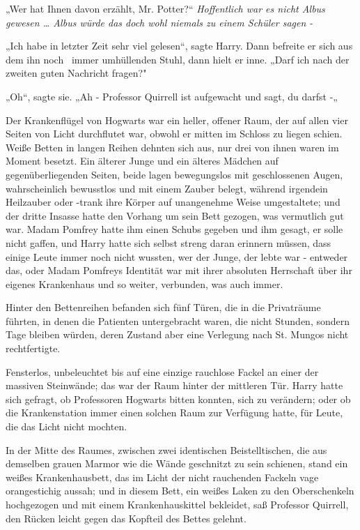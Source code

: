 {„Wer hat Ihnen davon erzählt, Mr. Potter?“ \emph{Hoffentlich war es nicht Albus gewesen … Albus würde das doch wohl niemals zu einem Schüler sagen} \emph{-}

„Ich habe in letzter Zeit sehr viel gelesen“, sagte Harry. Dann befreite er sich aus dem ihn noch ~immer umhüllenden Stuhl, dann hielt er inne. „Darf ich nach der zweiten guten Nachricht fragen?"

„Oh“, sagte sie. „Ah - Professor Quirrell ist aufgewacht und sagt, du darfst -„

Der Krankenflügel von Hogwarts war ein heller, offener Raum, der auf allen vier Seiten von Licht durchflutet war, obwohl er mitten im Schloss zu liegen schien. Weiße Betten in langen Reihen dehnten sich aus, nur drei von ihnen waren im Moment besetzt. Ein älterer Junge und ein älteres Mädchen auf gegenüberliegenden Seiten, beide lagen bewegungslos mit geschlossenen Augen, wahrscheinlich bewusstlos und mit einem Zauber belegt, während irgendein Heilzauber oder -trank ihre Körper auf unangenehme Weise umgestaltete; und der dritte Insasse hatte den Vorhang um sein Bett gezogen, was vermutlich gut war. Madam Pomfrey hatte ihm einen Schubs gegeben und ihm gesagt, er solle nicht gaffen, und Harry hatte sich selbst streng daran erinnern müssen, dass einige Leute immer noch nicht wussten, wer der Junge, der lebte war - entweder das, oder Madam Pomfreys Identität war mit ihrer absoluten Herrschaft über ihr eigenes Krankenhaus und so weiter, verbunden, was auch immer.

Hinter den Bettenreihen befanden sich fünf Türen, die in die Privaträume führten, in denen die Patienten untergebracht waren, die nicht Stunden, sondern Tage bleiben würden, deren Zustand aber eine Verlegung nach St. Mungos nicht rechtfertigte.

Fensterlos, unbeleuchtet bis auf eine einzige rauchlose Fackel an einer der massiven Steinwände; das war der Raum hinter der mittleren Tür. Harry hatte sich gefragt, ob Professoren Hogwarts bitten konnten, sich zu verändern; oder ob die Krankenstation immer einen solchen Raum zur Verfügung hatte, für Leute, die das Licht nicht mochten.

In der Mitte des Raumes, zwischen zwei identischen Beistelltischen, die aus demselben grauen Marmor wie die Wände geschnitzt zu sein schienen, stand ein weißes Krankenhausbett, das im Licht der nicht rauchenden Fackeln vage orangestichig aussah; und in diesem Bett, ein weißes Laken zu den Oberschenkeln hochgezogen und mit einem Krankenhauskittel bekleidet, saß Professor Quirrell, den Rücken leicht gegen das Kopfteil des Bettes gelehnt.

}
